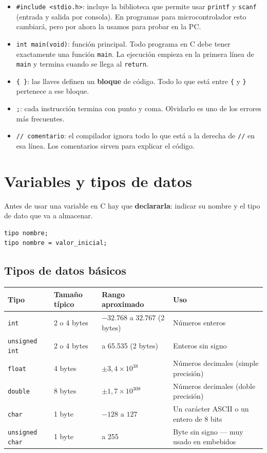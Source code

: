 \begin{itemize}
    \item \texttt{\#include <stdio.h>}: incluye la biblioteca que permite usar \texttt{printf} y \texttt{scanf} (entrada y salida por consola). En programas para microcontrolador esto cambiará, pero por ahora la usamos para probar en la PC.
    \item \texttt{int main(void)}: función principal. Todo programa en C debe tener exactamente una función \texttt{main}. La ejecución empieza en la primera línea de \texttt{main} y termina cuando se llega al \texttt{return}.
    \item \texttt{\{ \}}: las llaves definen un \textbf{bloque} de código. Todo lo que está entre \texttt{\{} y \texttt{\}} pertenece a ese bloque.
    \item \texttt{;}: cada instrucción termina con punto y coma. Olvidarlo es uno de los errores más frecuentes.
    \item \texttt{// comentario}: el compilador ignora todo lo que está a la derecha de \texttt{//} en esa línea. Los comentarios sirven para explicar el código.
\end{itemize}

\section{Variables y tipos de datos}

Antes de usar una variable en C hay que \textbf{declararla}: indicar su nombre y el tipo de dato que va a almacenar.

\begin{lstlisting}[style=estilo-c]
tipo nombre;
tipo nombre = valor_inicial;
\end{lstlisting}

\subsection{Tipos de datos básicos}

\begin{table}[H]
\centering
\begin{tabularx}{\textwidth}{ll>{\raggedright\arraybackslash}X>{\raggedright\arraybackslash}X}
\toprule
Tipo & Tamaño típico & Rango aproximado & Uso \\
\midrule
\texttt{int} & 2 o 4 bytes & $-32.768$ a $32.767$ (2 bytes) & Números enteros \\
\texttt{unsigned int} & 2 o 4 bytes & 0 a 65.535 (2 bytes) & Enteros sin signo \\
\texttt{float} & 4 bytes & $\pm 3{,}4 \times 10^{38}$ & Números decimales (simple precisión) \\
\texttt{double} & 8 bytes & $\pm 1{,}7 \times 10^{308}$ & Números decimales (doble precisión) \\
\texttt{char} & 1 byte & $-128$ a $127$ & Un carácter ASCII o un entero de 8 bits \\
\texttt{unsigned char} & 1 byte & 0 a 255 & Byte sin signo --- muy usado en embebidos \\
\bottomrule
\end{tabularx}
\end{table}

